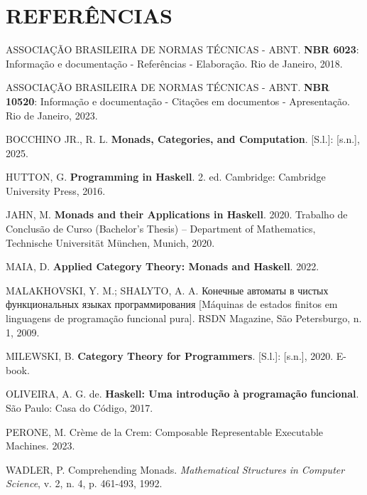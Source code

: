 \documentclass[12pt,a4paper]{article}
\begin{document}
\newpage

\section{REFERÊNCIAS}

ASSOCIAÇÃO BRASILEIRA DE NORMAS TÉCNICAS - ABNT. \textbf{NBR 6023}: Informação e documentação - Referências - Elaboração. Rio de Janeiro, 2018.

ASSOCIAÇÃO BRASILEIRA DE NORMAS TÉCNICAS - ABNT. \textbf{NBR 10520}: Informação e documentação - Citações em documentos - Apresentação. Rio de Janeiro, 2023.

BOCCHINO JR., R. L. \textbf{Monads, Categories, and Computation}. [S.l.]: [s.n.], 2025.

HUTTON, G. \textbf{Programming in Haskell}. 2. ed. Cambridge: Cambridge University Press, 2016.

JAHN, M. \textbf{Monads and their Applications in Haskell}. 2020. Trabalho de Conclusão de Curso (Bachelor's Thesis) -- Department of Mathematics, Technische Universität München, Munich, 2020.

MAIA, D. \textbf{Applied Category Theory: Monads and Haskell}. 2022.

MALAKHOVSKI, Y. M.; SHALYTO, A. A. Конечные автоматы в чистых функциональных языках программирования [Máquinas de estados finitos em linguagens de programação funcional pura]. RSDN Magazine, São Petersburgo, n. 1, 2009.

MILEWSKI, B. \textbf{Category Theory for Programmers}. [S.l.]: [s.n.], 2020. E-book.

OLIVEIRA, A. G. de. \textbf{Haskell: Uma introdução à programação funcional}. São Paulo: Casa do Código, 2017.

PERONE, M. Crème de la Crem: Composable Representable Executable Machines. 2023.

WADLER, P. Comprehending Monads. \textit{Mathematical Structures in Computer Science}, v. 2, n. 4, p. 461-493, 1992.

\end{document}

